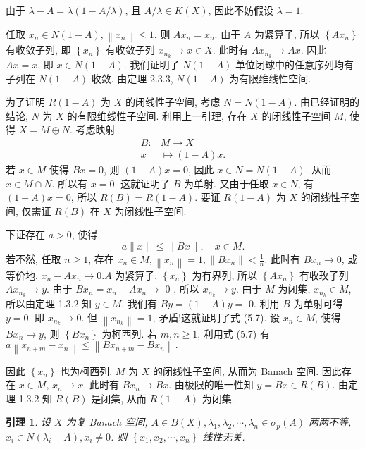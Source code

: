 \documentclass[openany]{ctexbook}
\makeatletter
\theoremstyle{kaiti}
\newtheorem{lemma}{引理}[section]
\theoremstyle{normal}
\renewenvironment{proof}[1][\proofname]{\par
    \pushQED{\qed}%
    \normalfont \topsep6\p@\@plus6\p@\relax
    \trivlist
    \item\relax
    {\heiti #1}\hspace{2\labelsep}\ignorespaces
  }{%
    \popQED\endtrivlist\@endpefalse
  }
\makeatother
\begin{document}
\begin{proof}
由于 $\lambda-A=\lambda(1-A / \lambda)$, 且 $A / \lambda \in K(X)$, 因此不妨假设 $\lambda=1$.

任取 $x_n \in N(1-A),\left\|x_n\right\| \leqslant 1$. 则 $A x_n=x_n$. 由于 $A$ 为紧算子, 所以 $\left\{A x_n\right\}$ 有收敛子列, 即 $\left\{x_n\right\}$ 有收敛子列 $x_{n_{k}} \rightarrow x \in X$. 此时有 $A x_{n_{k}} \rightarrow A x$. 因此 $A x=x$, 即 $x \in N(1-A)$. 我们证明了 $N(1-A)$ 单位闭球中的任意序列均有子列在 $N(1-A)$ 收敛. 由定理 2.3.3, $N(1-A)$ 为有限维线性空间.

为了证明 $R(1-A)$ 为 $X$ 的闭线性子空间, 考虑 $N=N(1-A)$. 由已经证明的结论, $N$ 为 $X$ 的有限维线性子空间. 利用上一引理, 存在 $X$ 的闭线性子空间 $M$, 使得 $X=M \oplus N$. 考虑映射
$$
\begin{aligned}
B: & M \rightarrow X \\
x & \mapsto(1-A) x.
\end{aligned}
$$
若 $x \in M$ 使得 $B x=0$, 则 $(1-A) x=0$, 因此 $x \in N=N(1-A)$. 从而 $x \in M \cap N$. 所以有 $x=0$. 这就证明了 $B$ 为单射. 又由于任取 $x \in N$, 有 $(1-A) x=0$, 所以 $R(B)=R(1-A)$. 要证 $R(1-A)$ 为 $X$ 的闭线性子空间, 仅需证 $R(B)$ 在 $X$ 为闭线性子空间.

下证存在 $a>0$, 使得
\begin{equation}
  a\|x\| \leqslant\|B x\|, \quad x \in M.
\end{equation}
若不然, 任取 $n \geqslant 1$, 存在 $x_n \in M,\left\|x_n\right\|=1,\left\|B x_n\right\|<\frac{1}{n}$. 此时有 $B x_n \rightarrow 0$, 或等价地, $x_n-A x_n \rightarrow 0. A$ 为紧算子, $\left\{x_n\right\}$ 为有界列, 所以 $\left\{A x_n\right\}$ 有收玫子列 $A x_{n_{k}} \rightarrow y$. 由于 $B x_n=x_n-A x_n \rightarrow$ 0 , 所以 $x_{n_{k}} \rightarrow y$. 由于 $M$ 为闭集, $x_{n_{k}} \in M$, 所以由定理 1.3.2 知 $y \in M$. 我们有 $B y=(1-A) y=$ 0. 利用 $B$ 为单射可得 $y=0$. 即 $x_{n_{k}} \rightarrow 0$. 但 $\left\|x_{n_{k}}\right\|=1$, 矛盾!这就证明了式 (5.7). 设 $x_n \in M$, 使得 $B x_n \rightarrow y$, 则 $\left\{B x_n\right\}$ 为柯西列. 若 $m, n \geqslant 1$, 利用式 (5.7) 有 $a\left\|x_{n+m}-x_n\right\| \leqslant\left\|B x_{n+m}-B x_n\right\|.$

因此 $\left\{x_n\right\}$ 也为柯西列. $M$ 为 $X$ 的闭线性子空间, 从而为 Banach 空间. 因此存在 $x \in M$, $x_n \rightarrow x$. 此时有 $B x_n \rightarrow B x$. 由极限的唯一性知 $y=B x \in R(B)$. 由定理 1.3.2 知 $R(B)$ 是闭集, 从而 $R(1-A)$ 为闭集.
\end{proof}

\begin{lemma}
设 $X$ 为复 Banach 空间, $A \in B(X), \lambda_1, \lambda_2, \cdots, \lambda_n \in \sigma_{p}(A)$ 两两不等, $x_{i} \in N\left(\lambda_{i}-A\right), x_{i} \neq 0$. 则 $\left\{x_1, x_2, \cdots, x_n\right\}$ 线性无关.
\end{lemma}
\end{document}
